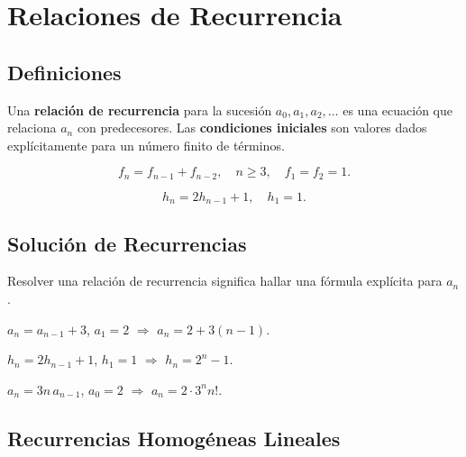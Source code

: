 \chapter{Relaciones de Recurrencia}

\section{Definiciones}

\begin{definicion}
Una \textbf{relación de recurrencia} para la sucesión $a_0, a_1, a_2, \ldots$ es una ecuación que relaciona $a_n$ con predecesores. Las \textbf{condiciones iniciales} son valores dados explícitamente para un número finito de términos.
\end{definicion}

\begin{ejemplo}[Fibonacci]
\[
f_n = f_{n-1} + f_{n-2}, \quad n \geq 3, \quad f_1 = f_2 = 1.
\]
\end{ejemplo}

\begin{ejemplo}
\[
h_n = 2h_{n-1} + 1, \quad h_1 = 1.
\]
\end{ejemplo}

\section{Solución de Recurrencias}

\begin{definicion}
Resolver una relación de recurrencia significa hallar una fórmula explícita para $a_n$.
\end{definicion}

\begin{ejemplo}
$a_n = a_{n-1} + 3$, $a_1 = 2$ $\Rightarrow$ $a_n = 2 + 3(n-1)$.
\end{ejemplo}

\begin{ejemplo}
$h_n = 2h_{n-1} + 1$, $h_1 = 1$ $\Rightarrow$ $h_n = 2^n - 1$.
\end{ejemplo}

\begin{ejemplo}
$a_n = 3n\,a_{n-1}$, $a_0 = 2$ $\Rightarrow$ $a_n = 2 \cdot 3^n n!$.
\end{ejemplo}

\section{Recurrencias Homogéneas Lineales}

